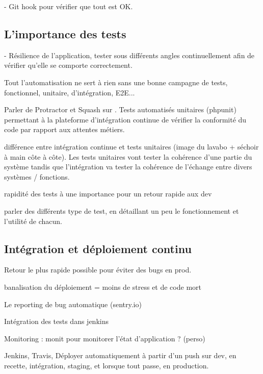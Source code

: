 - Git hook pour vérifier que tout est OK.


\subsection{L'importance des tests} \label{importance-test}



- Résilience de l'application, tester sous différents angles continuellement afin de vérifier qu'elle se comporte correctement.

Tout l'automatisation ne sert à rien sans une bonne campagne de tests, fonctionnel, unitaire, d'intégration, E2E...

Parler de Protractor et Squash sur \bv. Tests automatisés unitaires (phpunit) permettant à la plateforme d'intégration continue de vérifier la conformité du code par rapport aux attentes métiers.

différence entre intégration continue et tests unitaires (image du lavabo + séchoir à main côte à côte). Les tests unitaires vont tester la cohérence d'une partie du système tandis que l'intégration va tester la cohérence de l'échange entre divers systèmes / fonctions.

rapidité des tests à une importance pour un retour rapide aux dev

parler des différents type de test, en détaillant un peu le fonctionnement et l'utilité de chacun.
\subsection{Intégration et déploiement continu}


Retour le plus rapide possible pour éviter des bugs en prod. 

banalisation du déploiement = moins de stress et de code mort

Le reporting de bug automatique (sentry.io)

Intégration des tests dans jenkins

Monitoring : monit pour monitorer l'état d'application ? (perso)

Jenkins, Travis, Déployer automatiquement à partir d'un push sur dev, en recette, intégration, staging, et lorsque tout passe, en production.

